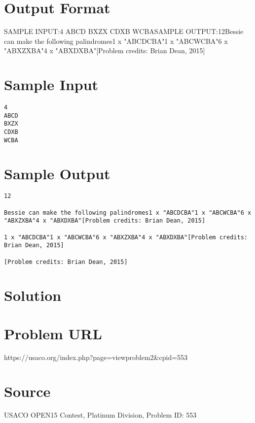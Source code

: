 \documentclass[12pt]{article}
\begin{document}
\section*{Output Format}
SAMPLE INPUT:4
ABCD
BXZX
CDXB
WCBASAMPLE OUTPUT:12Bessie can make the following palindromes1 x "ABCDCBA"1 x "ABCWCBA"6 x "ABXZXBA"4 x "ABXDXBA"[Problem credits: Brian Dean, 2015]

\section*{Sample Input}
\begin{verbatim}
4
ABCD
BXZX
CDXB
WCBA
\end{verbatim}

\section*{Sample Output}
\begin{verbatim}
12

Bessie can make the following palindromes1 x "ABCDCBA"1 x "ABCWCBA"6 x "ABXZXBA"4 x "ABXDXBA"[Problem credits: Brian Dean, 2015]

1 x "ABCDCBA"1 x "ABCWCBA"6 x "ABXZXBA"4 x "ABXDXBA"[Problem credits: Brian Dean, 2015]

[Problem credits: Brian Dean, 2015]
\end{verbatim}

\section*{Solution}


\section*{Problem URL}
https://usaco.org/index.php?page=viewproblem2&cpid=553

\section*{Source}
USACO OPEN15 Contest, Platinum Division, Problem ID: 553
\end{document}
